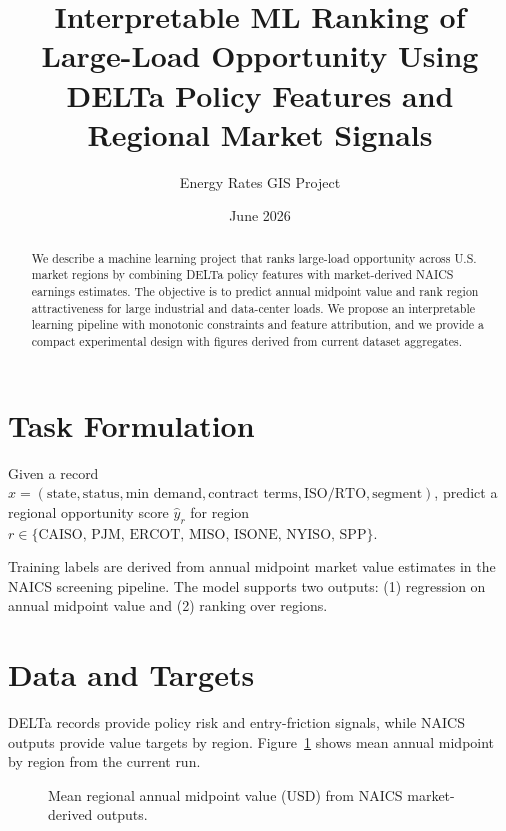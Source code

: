 \documentclass[11pt]{article}
\title{Interpretable ML Ranking of Large-Load Opportunity Using DELTa Policy Features and Regional Market Signals}
\author{Energy Rates GIS Project}
\date{June 2026}
\begin{document}
\maketitle

\begin{abstract}
We describe a machine learning project that ranks large-load opportunity across U.S. market regions by combining DELTa policy features with market-derived NAICS earnings estimates. The objective is to predict annual midpoint value and rank region attractiveness for large industrial and data-center loads. We propose an interpretable learning pipeline with monotonic constraints and feature attribution, and we provide a compact experimental design with figures derived from current dataset aggregates.
\end{abstract}

\section{Task Formulation}
Given a record $x = (\text{state}, \text{status}, \text{min demand}, \text{contract terms}, \text{ISO/RTO}, \text{segment})$, predict a regional opportunity score $\hat{y}_{r}$ for region $r \in \{\text{CAISO, PJM, ERCOT, MISO, ISONE, NYISO, SPP}\}$.

Training labels are derived from annual midpoint market value estimates in the NAICS screening pipeline. The model supports two outputs: (1) regression on annual midpoint value and (2) ranking over regions.

\section{Data and Targets}
DELTa records provide policy risk and entry-friction signals, while NAICS outputs provide value targets by region. Figure~\ref{fig:naicsmean} shows mean annual midpoint by region from the current run.

\begin{figure}[ht]
\centering
{}
\caption{Mean regional annual midpoint value (USD) from NAICS market-derived outputs.}
\label{fig:naicsmean}
\end{figure}
\end{document}
